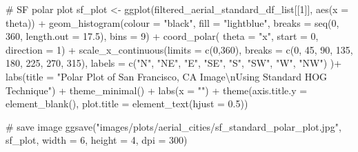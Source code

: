 \documentclass[
  letterpaper,
  DIV=11,
  numbers=noendperiod]{scrreprt}
\newenvironment{Shaded}{\begin{snugshade}}{\end{snugshade}}
\newcommand{\AttributeTok}[1]{\textcolor[rgb]{0.40,0.45,0.13}{#1}}
\newcommand{\CommentTok}[1]{\textcolor[rgb]{0.37,0.37,0.37}{#1}}
\newcommand{\DecValTok}[1]{\textcolor[rgb]{0.68,0.00,0.00}{#1}}
\newcommand{\FloatTok}[1]{\textcolor[rgb]{0.68,0.00,0.00}{#1}}
\newcommand{\FunctionTok}[1]{\textcolor[rgb]{0.28,0.35,0.67}{#1}}
\newcommand{\NormalTok}[1]{\textcolor[rgb]{0.00,0.23,0.31}{#1}}
\newcommand{\OtherTok}[1]{\textcolor[rgb]{0.00,0.23,0.31}{#1}}
\newcommand{\SpecialCharTok}[1]{\textcolor[rgb]{0.37,0.37,0.37}{#1}}
\newcommand{\StringTok}[1]{\textcolor[rgb]{0.13,0.47,0.30}{#1}}
\begin{document}
\begin{Shaded}
\begin{Highlighting}[]
\CommentTok{\# SF polar plot}
\NormalTok{sf\_plot }\OtherTok{\textless{}{-}}
  \FunctionTok{ggplot}\NormalTok{(filtered\_aerial\_standard\_df\_list[[}\DecValTok{1}\NormalTok{]], }
         \FunctionTok{aes}\NormalTok{(}\AttributeTok{x =}\NormalTok{ theta)) }\SpecialCharTok{+}
  \FunctionTok{geom\_histogram}\NormalTok{(}\AttributeTok{colour =} \StringTok{"black"}\NormalTok{, }
                 \AttributeTok{fill =} \StringTok{"lightblue"}\NormalTok{, }
                 \AttributeTok{breaks =} \FunctionTok{seq}\NormalTok{(}\DecValTok{0}\NormalTok{, }\DecValTok{360}\NormalTok{, }\AttributeTok{length.out =} \FloatTok{17.5}\NormalTok{),}
                 \AttributeTok{bins =} \DecValTok{9}\NormalTok{) }\SpecialCharTok{+}
  \FunctionTok{coord\_polar}\NormalTok{(}
    \AttributeTok{theta =} \StringTok{"x"}\NormalTok{, }
    \AttributeTok{start =} \DecValTok{0}\NormalTok{, }
    \AttributeTok{direction =} \DecValTok{1}\NormalTok{) }\SpecialCharTok{+}
  \FunctionTok{scale\_x\_continuous}\NormalTok{(}\AttributeTok{limits =} \FunctionTok{c}\NormalTok{(}\DecValTok{0}\NormalTok{,}\DecValTok{360}\NormalTok{),}
    \AttributeTok{breaks =} \FunctionTok{c}\NormalTok{(}\DecValTok{0}\NormalTok{, }\DecValTok{45}\NormalTok{, }\DecValTok{90}\NormalTok{, }\DecValTok{135}\NormalTok{, }\DecValTok{180}\NormalTok{, }\DecValTok{225}\NormalTok{, }\DecValTok{270}\NormalTok{, }\DecValTok{315}\NormalTok{), }
    \AttributeTok{labels =} \FunctionTok{c}\NormalTok{(}\StringTok{"N"}\NormalTok{, }\StringTok{"NE"}\NormalTok{, }\StringTok{"E"}\NormalTok{, }\StringTok{"SE"}\NormalTok{, }\StringTok{"S"}\NormalTok{, }\StringTok{"SW"}\NormalTok{, }\StringTok{"W"}\NormalTok{, }\StringTok{"NW"}\NormalTok{)}
\NormalTok{  )}\SpecialCharTok{+}
  \FunctionTok{labs}\NormalTok{(}\AttributeTok{title =} \StringTok{"Polar Plot of San Francisco, CA Image}\SpecialCharTok{\textbackslash{}n}\StringTok{Using Standard HOG Technique"}\NormalTok{) }\SpecialCharTok{+}
  \FunctionTok{theme\_minimal}\NormalTok{() }\SpecialCharTok{+}
  \FunctionTok{labs}\NormalTok{(}\AttributeTok{x =} \StringTok{""}\NormalTok{) }\SpecialCharTok{+}
  \FunctionTok{theme}\NormalTok{(}\AttributeTok{axis.title.y =} \FunctionTok{element\_blank}\NormalTok{(),}
        \AttributeTok{plot.title =} \FunctionTok{element\_text}\NormalTok{(}\AttributeTok{hjust =} \FloatTok{0.5}\NormalTok{))}

\CommentTok{\# save image}
\FunctionTok{ggsave}\NormalTok{(}\StringTok{"images/plots/aerial\_cities/sf\_standard\_polar\_plot.jpg"}\NormalTok{, sf\_plot, }\AttributeTok{width =} \DecValTok{6}\NormalTok{, }\AttributeTok{height =} \DecValTok{4}\NormalTok{, }\AttributeTok{dpi =} \DecValTok{300}\NormalTok{)}
\end{Highlighting}
\end{Shaded}
\end{document}
